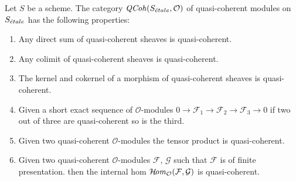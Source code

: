 \begin{lemma}
\label{lemma-properties-quasi-coherent}
Let $S$ be a scheme. The category $\mathit{QCoh}(S_{\acute{e}tale}, \mathcal{O})$
of quasi-coherent modules on $S_{\acute{e}tale}$
has the following properties:
\begin{enumerate}
\item Any direct sum of quasi-coherent sheaves is quasi-coherent.
\item Any colimit of quasi-coherent sheaves is quasi-coherent.
\item The kernel and cokernel of a morphism of quasi-coherent sheaves
is quasi-coherent.
\item Given a short exact sequence of $\mathcal{O}$-modules
$0 \to \mathcal{F}_1 \to \mathcal{F}_2 \to \mathcal{F}_3 \to 0$
if two out of three are quasi-coherent so is the third.
\item Given two quasi-coherent $\mathcal{O}$-modules
the tensor product is quasi-coherent.
\item Given two quasi-coherent $\mathcal{O}$-modules
$\mathcal{F}$, $\mathcal{G}$ such that $\mathcal{F}$
is of finite presentation.
then the internal hom
$\mathop{\mathcal{H}\!\mathit{om}}\nolimits_\mathcal{O}(\mathcal{F}, \mathcal{G})$
is quasi-coherent.
\end{enumerate}
\end{lemma}


